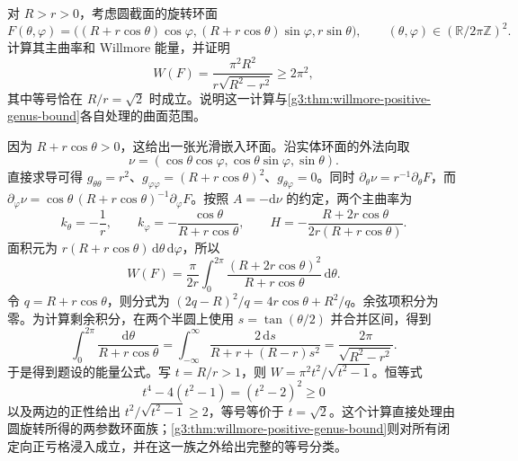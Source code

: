 \begin{optionalexercise}\label{g3:ex:willmore-revolution-torus}
	对 \(R>r>0\)，考虑圆截面的旋转环面
	\[
		F(\theta,\varphi)=\bigl((R+r\cos\theta)\cos\varphi,
		(R+r\cos\theta)\sin\varphi,r\sin\theta\bigr),
		\qquad (\theta,\varphi)\in(\mathbb R/2\pi\mathbb Z)^2.
	\]
	计算其主曲率和 Willmore 能量，并证明
	\[
		W(F)=\frac{\pi^2R^2}{r\sqrt{R^2-r^2}}\ge2\pi^2,
	\]
	其中等号恰在 \(R/r=\sqrt2\) 时成立。说明这一计算与\cref{g3:thm:willmore-positive-genus-bound}各自处理的曲面范围。
\end{optionalexercise}
\begin{solution}
	因为 \(R+r\cos\theta>0\)，这给出一张光滑嵌入环面。沿实体环面的外法向取
	\[
		\nu=(\cos\theta\cos\varphi,\cos\theta\sin\varphi,\sin\theta).
	\]
	直接求导可得 \(g_{\theta\theta}=r^2\)、\(g_{\varphi\varphi}=(R+r\cos\theta)^2\)、\(g_{\theta\varphi}=0\)。同时 \(\partial_\theta\nu=r^{-1}\partial_\theta F\)，而 \(\partial_\varphi\nu=\cos\theta\,(R+r\cos\theta)^{-1}\partial_\varphi F\)。按照 \(A=-\mathrm d\nu\) 的约定，两个主曲率为
	\[
		k_\theta=-\frac1r,
		\qquad k_\varphi=-\frac{\cos\theta}{R+r\cos\theta},
		\qquad H=-\frac{R+2r\cos\theta}{2r(R+r\cos\theta)}.
	\]
	面积元为 \(r(R+r\cos\theta)\,\mathrm d\theta\,\mathrm d\varphi\)，所以
	\[
		W(F)=\frac\pi{2r}\int_0^{2\pi}
		\frac{(R+2r\cos\theta)^2}{R+r\cos\theta}\,\mathrm d\theta.
	\]
	令 \(q=R+r\cos\theta\)，则分式为 \((2q-R)^2/q=4r\cos\theta+R^2/q\)。余弦项积分为零。为计算剩余积分，在两个半圆上使用 \(s=\tan(\theta/2)\) 并合并区间，得到
	\[
		\int_0^{2\pi}\frac{\mathrm d\theta}{R+r\cos\theta}
		=\int_{-\infty}^{\infty}\frac{2\,\mathrm ds}{R+r+(R-r)s^2}
		=\frac{2\pi}{\sqrt{R^2-r^2}}.
	\]
	于是得到题设的能量公式。写 \(t=R/r>1\)，则 \(W=\pi^2t^2/\sqrt{t^2-1}\)。恒等式
	\[
		t^4-4(t^2-1)=(t^2-2)^2\ge0
	\]
	以及两边的正性给出 \(t^2/\sqrt{t^2-1}\ge2\)，等号等价于 \(t=\sqrt2\)。这个计算直接处理由圆旋转所得的两参数环面族；\cref{g3:thm:willmore-positive-genus-bound}则对所有闭定向正亏格浸入成立，并在这一族之外给出完整的等号分类。
\end{solution}

